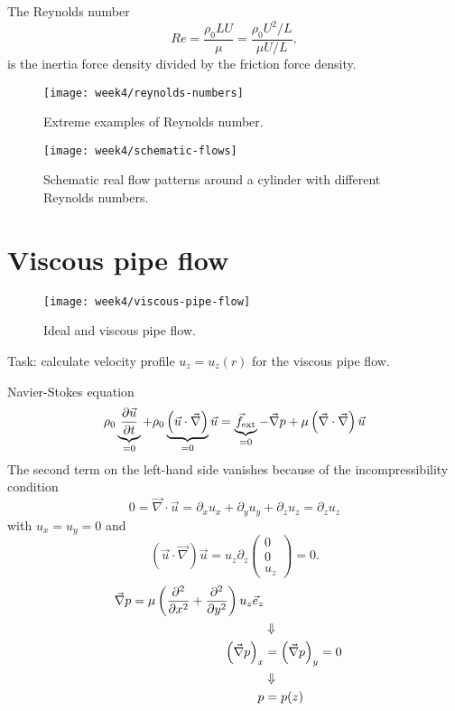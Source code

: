 The Reynolds number
\begin{equation}
Re = \frac{\rho_0 L U}{\mu} = \frac{\rho_0 U^2/L}{\mu U/L},
\end{equation}
is the inertia force density divided by the friction force density.

\begin{figure}[p]
    \centering
    \texttt{[image: week4/reynolds-numbers]}\\
    \caption{Extreme examples of Reynolds number.}
    \label{fig:reynolds-numbers}
\end{figure}

\begin{figure}[p]
    \centering
    \texttt{[image: week4/schematic-flows]}\\
    \caption{Schematic real flow patterns around a cylinder with different Reynolds numbers.}
    \label{fig:schematic-flows}
\end{figure}


\newpage
\section{Viscous pipe flow}

\begin{figure}[ht]
    \centering
    \texttt{[image: week4/viscous-pipe-flow]}\\
    \caption{Ideal and viscous pipe flow.}
    \label{fig:viscous-pipe-flow}
\end{figure}

Task: calculate velocity profile $u_z=u_z(r)$ for the viscous pipe flow.

Navier-Stokes equation
\begin{equation}
\rho_0\underbrace{\frac{\partial \vec{u}}{\partial t}}_{=0}+\rho_0\underbrace{\left(\vec{u}\cdot\vec{\nabla}\right)}_{=0}\vec{u} = \underbrace{\vec{f}_\mathrm{ext}}_{=0}-\vec{\nabla}p+\mu\left(\vec{\nabla}\cdot\vec{\nabla}\right)\vec{u}
\end{equation}
The second term on the left-hand side vanishes because of the incompressibility condition
\begin{equation}
0=\vec{\nabla}\cdot\vec{u}=\partial_xu_x+\partial_yu_y+\partial_zu_z = \partial_zu_z
\end{equation}
with $u_x=u_y=0$ and
\begin{equation}
\left(\vec{u}\cdot\vec{\nabla}\right)\vec{u} = u_z\partial_z
\begin{pmatrix}
0\\0\\u_z
\end{pmatrix} = 0.
\end{equation}
\begin{align}
\vec{\nabla}p = \mu\left(\frac{\partial^2 }{\partial x^2}+\frac{\partial^2 }{\partial y^2}\right)u_z\vec{e}_z\\
&\Downarrow\notag\\
\left(\vec{\nabla}p\right)_x &= \left(\vec{\nabla}p\right)_y = 0 \\
&\Downarrow\notag\\
p &= p(z)
\end{align}

